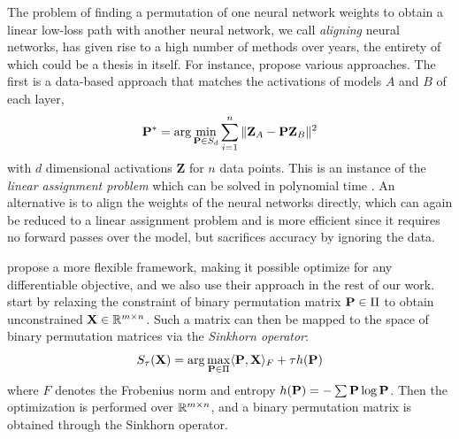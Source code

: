 The problem of finding a permutation of one neural network weights to obtain a linear low-loss path with another neural network, we call \textit{aligning} neural networks, has given rise to a high number of methods over years, the entirety of which could be a thesis in itself. For instance, \citep{ainsworthGitReBasinMerging2023} propose various approaches. The first is a data-based approach that matches the activations of models $A$ and $B$ of each layer,
\begin{equation}
    \mathbf{P}^* = \arg\min_{\mathbf{P} \in S_d} \sum_{i=1}^n \Vert \mathbf{Z}_A - \mathbf{P} \mathbf{Z}_B \Vert ^2
\end{equation}
with $d$ dimensional activations $\mathbf{Z}$ for $n$ data points. This is an instance of the \textit{linear assignment problem} which can be solved in polynomial time \citep{crouseImplementing2DRectangular2016}. An alternative is to align the weights of the neural networks directly, which can again be reduced to a linear assignment problem and is more efficient since it requires no forward passes over the model, but sacrifices accuracy by ignoring the data. 

\citet{penaReBasinImplicitSinkhorn2023} propose a more flexible framework, making it possible optimize for any differentiable objective, and we also use their approach in the rest of our work. \citet{penaReBasinImplicitSinkhorn2023} start by relaxing the constraint of binary permutation matrix $\mathbf{P} \in \Pi$ to obtain unconstrained $\mathbf{X} \in \mathbb{R}^{m\times n}$. Such a matrix can then be mapped to the space of binary permutation matrices via the \textit{Sinkhorn operator}:
\begin{equation} \label{eq:sinkhorn}
    S_\tau(\mathbf{X}) = \arg\max_{\mathbf{P} \in \Pi} \langle \mathbf{P}, \mathbf{X} \rangle_F + \tau h(\mathbf{P})
\end{equation}
where $F$ denotes the Frobenius norm and entropy $h(\mathbf{P}) = - \sum \mathbf{P} \log \mathbf{P}$. Then the optimization is performed over $\mathbb{R}^{m \times n}$, and a binary permutation matrix is obtained through the Sinkhorn operator. 

